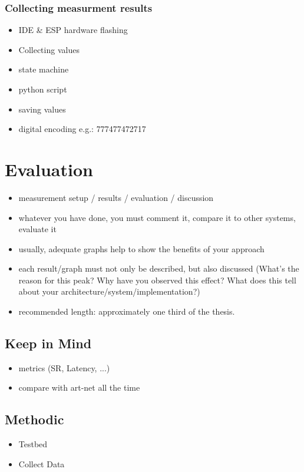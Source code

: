 \documentclass[]{ccs-thesis}
\begin{document}
\subsection*{Collecting measurment results}
\begin{itemize}
\item IDE \& ESP hardware flashing
\item Collecting values
\item state machine
\item python script
\item saving values
\item digital encoding e.g.: 777477472717
\end{itemize}

\chapter{Evaluation}
\begin{itemize}
\item measurement setup / results / evaluation / discussion
\item whatever you have done, you must comment it, compare it to other systems, evaluate it
\item usually, adequate graphs help to show the benefits of your approach
\item each result/graph must not only be described, but also discussed (What's the reason for this peak? Why have you observed this effect? What does this tell about your architecture/system/implementation?)
\item recommended length: approximately one third of the thesis.
\end{itemize}

\section*{Keep in Mind}
\begin{itemize}
\item metrics (SR, Latency, ...)
\item compare with art-net all the time
\end{itemize}

\section{Methodic}
\begin{itemize}
	\item Testbed
	\item Collect Data
\end{itemize}
\end{document}
